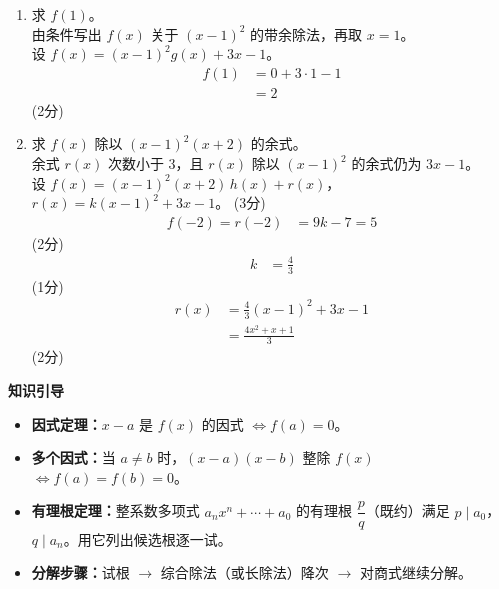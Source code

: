 \documentclass{exam-zh}
\begin{document}
\begin{solution}
    \begin{enumerate}[label=(\alph*)]
        \item 求 $f(1)$。 \\
        由条件写出 $f(x)$ 关于 $(x-1)^2$ 的带余除法，再取 $x=1$。 \\
        设 $f(x)=(x-1)^2g(x)+3x-1$。
        \begin{align*}
            f(1) &= 0+3\cdot 1-1 \\
            &= 2
        \end{align*}
        \hfill (2分)

        \item 求 $f(x)$ 除以 $(x-1)^2(x+2)$ 的余式。 \\
        余式 $r(x)$ 次数小于 $3$，且 $r(x)$ 除以 $(x-1)^2$ 的余式仍为 $3x-1$。 \\
        设 $f(x)=(x-1)^2(x+2)\,h(x)+r(x)$，$r(x)=k(x-1)^2+3x-1$。
        \hfill (3分)
        \begin{align*}
            f(-2) = r(-2) &= 9k-7 = 5
        \end{align*}
        \hfill (2分) \\
        \begin{align*}
            k &= \frac43
        \end{align*}
        \hfill (1分) \\
        \begin{align*}
            r(x) &= \frac43(x-1)^2+3x-1 \\
            &= \frac{4x^2+x+1}{3}
        \end{align*}
        \hfill (2分)
    \end{enumerate}
\end{solution}

\newpage

\medskip
\noindent\textbf{知识引导}
\begin{itemize}
  \item \textbf{因式定理：}$x-a$ 是 $f(x)$ 的因式 $\Longleftrightarrow f(a)=0$。
  \item \textbf{多个因式：}当 $a\neq b$ 时，$(x-a)(x-b)$ 整除 $f(x)$ $\Longleftrightarrow f(a)=f(b)=0$。
  \item \textbf{有理根定理：}整系数多项式 $a_nx^n+\cdots+a_0$ 的有理根 $\dfrac{p}{q}$（既约）满足 $p\mid a_0$，$q\mid a_n$。用它列出候选根逐一试。
  \item \textbf{分解步骤：}试根 $\to$ 综合除法（或长除法）降次 $\to$ 对商式继续分解。
\end{itemize}
\end{document}
